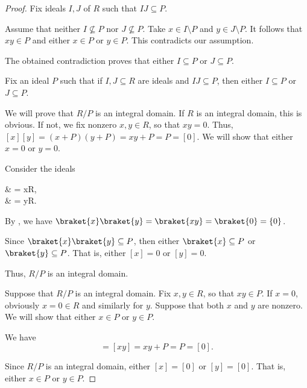 \begin{proof}
   Fix ideals \( I, J \) of \( R \) such that \( IJ \subseteq P \).

  Assume that neither \( I \not\subseteq P \) nor \( J \not\subseteq P \). Take \( x \in I \setminus P \) and \( y \in J \setminus P \). It follows that \( xy \in P \) and either \( x \in P \) or \( y \in P \). This contradicts our assumption.

  The obtained contradiction proves that either \( I \subseteq P \) or \( J \subseteq P \).

   Fix an ideal \( P \) such that if \( I, J \subseteq R \) are ideals and \( IJ \subseteq P \), then either \( I \subseteq P \) or \( J \subseteq P \).

  We will prove that \( R / P \) is an integral domain. If \( R \) is an integral domain, this is obvious. If not, we fix nonzero \( x, y \in R \), so that \( xy = 0 \). Thus, \( [x][y] = (x + P)(y + P) = xy + P = P = [0] \). We will show that either \( x = 0 \) or \( y = 0 \).

  Consider the ideals
  \begin{balign*}
     & = xR, \\
     & = yR.
  \end{balign*}

  By , we have \( \braket{x} \braket{y} = \braket{xy} = \braket{0} = \{ 0 \} \).

  Since \( \braket{x} \braket{y} \subseteq P \), then either \( \braket{x} \subseteq P \) or \( \braket{y} \subseteq P \). That is, either \( [x] = 0 \) or \( [y] = 0 \).

  Thus, \( R / P \) is an integral domain.

   Suppose that \( R / P \) is an integral domain. Fix \( x, y \in R \), so that \( xy \in P \). If \( x = 0 \), obviously \( x = 0 \in R \) and similarly for \( y \). Suppose that both \( x \) and \( y \) are nonzero. We will show that either \( x \in P \) or \( y \in P \).

  We have
  \begin{equation*}
    [x][y] = [xy] = xy + P = P = [0].
  \end{equation*}

  Since \( R / P \) is an integral domain, either \( [x] = [0] \) or \( [y] = [0] \). That is, either \( x \in P \) or \( y \in P \).
\end{proof}

